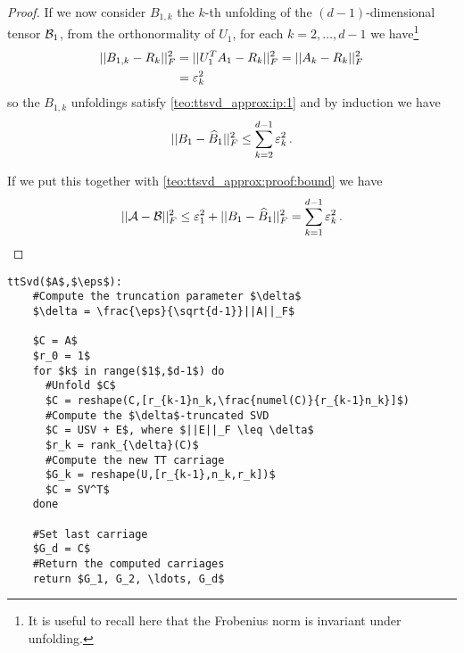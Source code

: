 \begin{Teo}
\begin{proof}
    If we now consider $B_{1,k}$ the $k$-th unfolding of the $(d-1)$-dimensional tensor $\mathcal{B}_1$, from the orthonormality of $U_1$, for each $k=2,\ldots,d-1$ we have\footnote{It is useful to recall here that the Frobenius norm is invariant under unfolding.}
    \begin{equation*}
      \begin{split}
        ||B_{1,k} - R_k||_F^2 &= ||U_1^T A_1 - R_k||_F^2 = ||A_k - R_k||_F^2\\
         &= \varepsilon_k^2
      \end{split}
    \end{equation*}
    so the $B_{1,k}$ unfoldings satisfy \eqref{teo:ttsvd_approx:ip:1} and by induction we have
    \begin{equation*}
      ||B_1 - \widehat{B}_1 ||_F^2 \le \sum_{k=2}^{d-1} \varepsilon_k^2\, .
    \end{equation*}

    If we put this together with \eqref{teo:ttsvd_approx:proof:bound} we have
    \begin{equation*}
      ||\mathcal{A} - \mathcal{B}||_F^2 \le \varepsilon_1^2 + ||B_1 - \widehat{B}_1 ||_F^2 = \sum_{k=1}^{d-1} \varepsilon_k^2\, .
    \end{equation*}
  \end{proof}
\end{Teo}

\begin{lstlisting}[float, caption=TT-SVD compression algorithm, label=algo:tt-svd, title=TT-SVD compression algorithm]
  ttSvd($A$,$\eps$):
    #Compute the truncation parameter $\delta$
    $\delta = \frac{\eps}{\sqrt{d-1}}||A||_F$
  
    $C = A$
    $r_0 = 1$
    for $k$ in range($1$,$d-1$) do
      #Unfold $C$
      $C = reshape(C,[r_{k-1}n_k,\frac{numel(C)}{r_{k-1}n_k}]$)
      #Compute the $\delta$-truncated SVD
      $C = USV + E$, where $||E||_F \leq \delta$
      $r_k = rank_{\delta}(C)$
      #Compute the new TT carriage
      $G_k = reshape(U,[r_{k-1},n_k,r_k])$
      $C = SV^T$
    done
    
    #Set last carriage
    $G_d = C$
    #Return the computed carriages
    return $G_1, G_2, \ldots, G_d$
\end{lstlisting}

